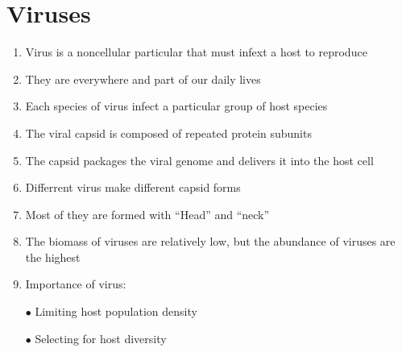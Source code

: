 \documentclass{report}
\begin{document}
\section{Viruses}
\begin{enumerate}
    \item Virus is a noncellular particular that must infext a host to reproduce
    \item They are everywhere and part of our daily lives
    \item Each species of virus infect a particular group of host species
    \item The viral capsid is composed of repeated protein subunits
    \item The capsid packages the viral genome and delivers it into the host cell
    \item Differrent virus make different capsid forms
    \item Most of they are formed with ``Head'' and ``neck''
    \item The biomass of viruses are relatively low, but the abundance of viruses are the highest
    \item Importance of virus:
    \item [$\bullet$]Limiting host population density
    \item [$\bullet$]Selecting for host diversity 
\end{enumerate}
\end{document}
